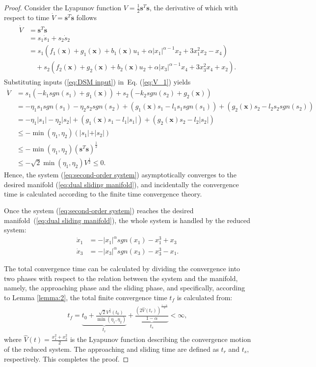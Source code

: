 \documentclass[3p]{elsarticle}
\theoremstyle{plain}
\theoremstyle{remark}
\begin{document}
\begin{proof}
Consider the Lyapunov function $V=\frac{1}{2}{\bm s}^T\bm s$, the derivative of which with respect to time $\dot V = {\bm s}^T \bm {\dot s}$ follows
\begin{align}
\begin{split}
\dot V &= {\bm s}^T\dot{\bm  s}\\
&=s_1\dot s_1+s_2\dot s_2\\
&=s_1(f_1(\bm x)+g_1(\bm x)+b_1(\bm x)u_1+\alpha\vert x_1\vert^{\alpha-1}x_2+3x_1^2x_2-x_4)\\
&\quad +s_2(f_2(\bm x)+g_2(\bm x)+b_2(\bm x)u_2+\alpha\vert x_3\vert^{\alpha-1}x_4+3x_3^2x_4+x_2).\label{eq:V_1}
\end{split}
\end{align}
Substituting inputs (\ref{eq:DSM input}) in~Eq. (\ref{eq:V_1}) yields
\begin{align*}
\dot V &= s_1(-k_1sgn(s_1)+g_1(\bm x))+s_2(-k_2sgn(s_2)+g_2(\bm x))\\
&= -\eta_1s_1sgn(s_1)-\eta_2s_2sgn(s_2)+(g_1(\bm x)s_1 - l_1s_1sgn(s_1))+(g_2(\bm x)s_2 - l_2s_2sgn(s_2))\\
&= -\eta_1\vert s_1\vert-\eta_2\vert s_2\vert+(g_1(\bm x)s_1 - l_1\vert s_1\vert)+(g_2(\bm x)s_2 - l_2\vert s_2\vert)\\
&\le - \min(\eta_1,\eta_2)(\vert s_1\vert+\vert s_2\vert)\\
&\le -\min(\eta_1,\eta_2)({\bm s}^T\bm s)^\frac{1}{2}\\
&\le -\sqrt{2}\min(\eta_1,\eta_2)V^\frac{1}{2}\le 0.
\end{align*}
Hence, the system (\ref{eq:second-order system}) asymptotically converges to the desired manifold (\ref{eq:dual sliding manifold}), and incidentally the convergence time is calculated according to the finite time convergence theory.\par
Once the system (\ref{eq:second-order system}) reaches the desired manifold~(\ref{eq:dual sliding manifold}), the whole system is handled by the reduced system:
\begin{align*}
\dot x_1&=-\vert x_1\vert^\alpha sgn(x_1)-x_1^3+x_3\\
\dot x_3&=-\vert x_3\vert^\alpha sgn(x_3)-x_3^3-x_1.
\end{align*}\par
The total convergence time can be calculated by dividing the convergence into two phases with respect to the relation between the system and the manifold, namely, the approaching phase and the sliding phase, and specifically, according to Lemma \ref{lemma:2}, the total finite convergence time $t_f$ is calculated from:
\begin{align}
t_f = \underbrace{t_0+\frac{\sqrt{2}V^{\frac{1}{2}}(t_0)}{\min(\eta_1,\eta_2)}}_{t_r}+\underbrace{\frac{(2\hat V(t_r))^{\frac{1-\alpha}{2}}}{1-\alpha}}_{t_s}<\infty,
\end{align}
where $\hat V(t) = \frac{x_1^2+x_3^2}{2}$ is the Lyapunov function describing the convergence motion of the reduced system. The approaching and sliding time are defined as $t_r$ and $t_s$, respectively. This completes the proof.
\end{proof}
\end{document}
